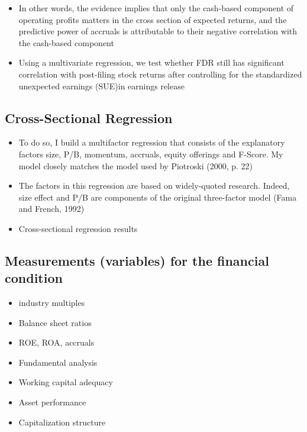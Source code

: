 \documentclass[12pt]{article}
\begin{document}
\begin{itemize}
        \item In other words, the evidence implies that only the cash-based component of operating profits matters in the cross section of expected returns, and the predictive power of accruals is attributable to their negative correlation with the cash-based component \citep{Ball2016}
       
        \item Using a multivariate regression, we test whether FDR still has significant correlation with post-filing stock returns after controlling for the standardized unexpected earnings (SUE)in earnings release \citep{You2009}

    \end{itemize}

\subsection{Cross-Sectional Regression}

    \begin{itemize}
        \item To do so, I build a multifactor regression that consists of the explanatory factors size, P/B, momentum, accruals, equity offerings and F-Score. My model closely matches the model used by Piotroski (2000, p. 22) \citep{Mohr2012}

        \item The factors in this regression are based on widely-quoted research. Indeed, size effect and P/B are components of the original three-factor model (Fama and French, 1992) \citep{Mohr2012}

        \item Cross-sectional regression results \citep[p.3094]{Akhigbe2007}
    \end{itemize}


\subsection{Measurements (variables) for the financial condition} 
    
    \begin{itemize}

        \item industry multiples
        \item Balance sheet ratios
        \item ROE, ROA, accruals 
        \item Fundamental analysis
        \item Working capital adequacy
        \item Asset performance
        \item Capitalization structure

    \end{itemize}
    
\end{document}
